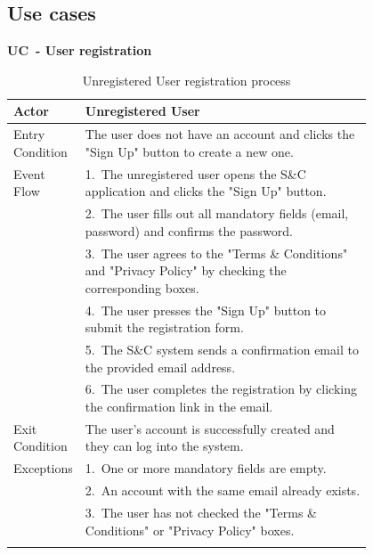 \subsection{Use cases}
\label{subsec: use_cases}%

\setcounter{uc}{1}
\newcommand{\cuc}{\theuc{}}

\textbf{UC\cuc\  - User registration}

\begin{center} 
    \renewcommand{\arraystretch}{1.2} 
    \begin{longtable}{ l p{0.8\linewidth} } 
        \hline 
        Actor & Unregistered User \\ \hline 
        Entry Condition & The user does not have an account and clicks the "Sign Up" button to create a new one. \\ \hline 
        Event Flow & 1.\ The unregistered user opens the S\&C application and clicks the "Sign Up" button. \\ 
        & 2.\ The user fills out all mandatory fields (email, password) and confirms the password. \\ 
        & 3.\ The user agrees to the "Terms \& Conditions" and "Privacy Policy" by checking the corresponding boxes. \\ 
        & 4.\ The user presses the "Sign Up" button to submit the registration form. \\ 
        & 5.\ The S\&C system sends a confirmation email to the provided email address. \\ 
        & 6.\ The user completes the registration by clicking the confirmation link in the email. \\ \hline 
        Exit Condition & The user's account is successfully created and they can log into the system. \\ \hline 
        Exceptions & 1.\ One or more mandatory fields are empty. \\ 
        & 2.\ An account with the same email already exists. \\ 
        & 3.\ The user has not checked the "Terms \& Conditions" or "Privacy Policy" boxes. \\ \hline 
        \caption{Unregistered User registration process} 
        \label{tab:user_registration_uc} 
    \end{longtable} 
\end{center}

